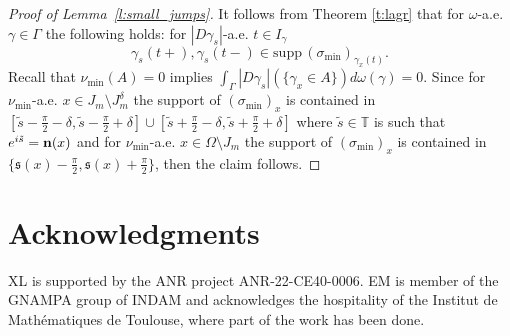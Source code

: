 \documentclass[fleqn
]{article}
\numberwithin{equation}{section}
\newcommand{\T}{{\mathbb T}}
\theoremstyle{definition}
\begin{document}
\begin{proof}[Proof of Lemma~\ref{l:small_jumps}]
It follows from Theorem \ref{t:lagr} that for $\omega$-a.e. $\gamma \in \Gamma$ the following holds: for $|D\gamma_s|$-a.e. $t \in I_\gamma$
\[
\gamma_s(t+), \gamma_s(t-) \in \mathrm{supp}\, (\sigma_{\min})_{\gamma_x(t)}.
\]
Recall that $\nu_{\min}(A)=0$ implies $\int_{\Gamma}|D\gamma_s|(\{\gamma_x \in A\}) d \omega (\gamma)=0$.
Since for $\nu_{\min}$-a.e. $x \in J _m\setminus J_m^\delta$ the support of $(\sigma_{\min})_x$ is contained in $[\tilde s - \frac\pi2 - \delta,  \tilde s -\frac\pi2 + \delta] \cup [\tilde s + \frac\pi2 - \delta,  \tilde s +\frac\pi2 + \delta] $ where $\tilde s\in \T$ is such that $e^{i\tilde s} = {\bf n}(x)$ and for $\nu_{\min}$-a.e. $x \in \Omega \setminus J_m$ the support of $(\sigma_{\min})_x$ is contained in $\{ \mathfrak s(x)-\frac \pi2,  \mathfrak s(x)+\frac \pi2\}$, then the claim follows.
\end{proof}

\section*{Acknowledgments} 
XL is supported by the ANR project ANR-22-CE40-0006.
EM is member of the GNAMPA group of INDAM and acknowledges the hospitality of the Institut de Math\'ematiques de Toulouse, where part of the work has been done.


\small



\end{document}
